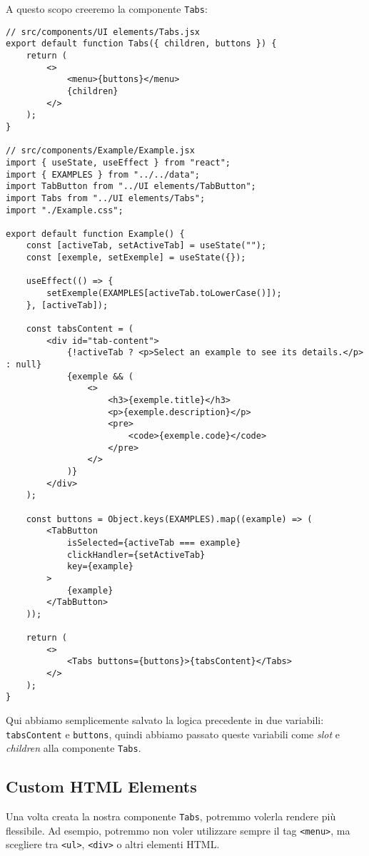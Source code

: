 \documentclass[12pt]{article}
\begin{document}
\pagebreak
A questo scopo creeremo la componente \texttt{Tabs}:
\begin{verbatim}
// src/components/UI elements/Tabs.jsx
export default function Tabs({ children, buttons }) {
    return (
        <>
            <menu>{buttons}</menu>
            {children}
        </>
    );
}

// src/components/Example/Example.jsx
import { useState, useEffect } from "react";
import { EXAMPLES } from "../../data";
import TabButton from "../UI elements/TabButton";
import Tabs from "../UI elements/Tabs";
import "./Example.css";

export default function Example() {
    const [activeTab, setActiveTab] = useState("");
    const [exemple, setExemple] = useState({});

    useEffect(() => {
        setExemple(EXAMPLES[activeTab.toLowerCase()]);
    }, [activeTab]);

    const tabsContent = (
        <div id="tab-content">
            {!activeTab ? <p>Select an example to see its details.</p> : null}
            {exemple && (
                <>
                    <h3>{exemple.title}</h3>
                    <p>{exemple.description}</p>
                    <pre>
                        <code>{exemple.code}</code>
                    </pre>
                </>
            )}
        </div>
    );

    const buttons = Object.keys(EXAMPLES).map((example) => (
        <TabButton
            isSelected={activeTab === example}
            clickHandler={setActiveTab}
            key={example}
        >
            {example}
        </TabButton>
    ));

    return (
        <>
            <Tabs buttons={buttons}>{tabsContent}</Tabs>
        </>
    );
}
\end{verbatim}

\pagebreak
Qui abbiamo semplicemente salvato la logica precedente in due variabili:
\texttt{tabsContent} e \texttt{buttons}, quindi abbiamo passato queste
variabili come {\it slot} e {\it children} alla componente \texttt{Tabs}.

\subsection{Custom HTML Elements}
Una volta creata la nostra componente \texttt{Tabs}, potremmo 
volerla rendere più flessibile. Ad esempio, potremmo non voler 
utilizzare sempre il tag \texttt{<menu>}, ma scegliere tra 
\texttt{<ul>}, \texttt{<div>} o altri elementi HTML.  
\end{document}
